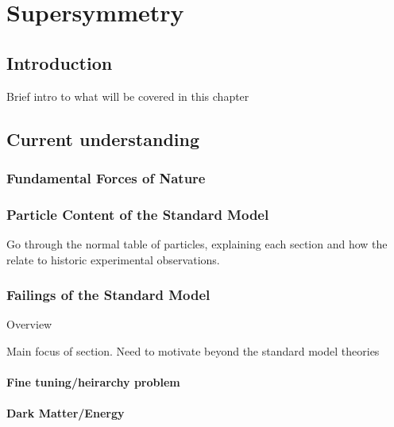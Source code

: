 
\chapter{Supersymmetry}

\ifpdf
    \graphicspath{{Chapter2/Figs/Raster/}{Chapter2/Figs/PDF/}{Chapter2/Figs/}}
\else
    \graphicspath{{Chapter2/Figs/Vector/}{Chapter2/Figs/}}
\fi


\section{Introduction}  %
\label{sec:supersymmetry_intro}

Brief intro to what will be covered in this chapter

\section{Current understanding}
\label{sec:supersymmetry_current}
\subsection{Fundamental Forces of Nature}

\subsection{Particle Content of the Standard Model}
Go through the normal table of particles, explaining each section and how the relate 
to historic experimental observations.

\subsection{Failings of the Standard Model}
Overview

Main focus of section. Need to motivate beyond the standard model theories

\subsubsection{Fine tuning/heirarchy problem}
\subsubsection{Dark Matter/Energy}


